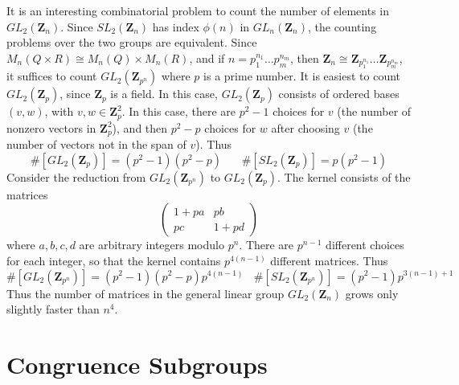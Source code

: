 It is an interesting combinatorial problem to count the number of elements in $GL_2(\mathbf{Z}_n)$. Since $SL_2(\mathbf{Z}_n)$ has index $\phi(n)$ in $GL_n(\mathbf{Z}_n)$, the counting problems over the two groups are equivalent. Since $M_n(Q \times R) \cong M_n(Q) \times M_n(R)$, and if $n = p_1^{n_1} \dots p_m^{n_m}$, then $\mathbf{Z}_n \cong \mathbf{Z}_{p_1^{n_1}} \dots \mathbf{Z}_{p_m^{n_m}}$, it suffices to count $GL_2(\mathbf{Z}_{p^n})$ where $p$ is a prime number. It is easiest to count $GL_2(\mathbf{Z}_p)$, since $\mathbf{Z}_p$ is a field. In this case, $GL_2(\mathbf{Z}_p)$ consists of ordered bases $(v,w)$, with $v,w \in \mathbf{Z}_p^2$. In this case, there are $p^2 - 1$ choices for $v$ (the number of nonzero vectors in $\mathbf{Z}_p^2$), and then $p^2 - p$ choices for $w$ after choosing $v$ (the number of vectors not in the span of $v$). Thus
%
\[ \#[GL_2(\mathbf{Z}_p)] = (p^2 - 1)(p^2 - p)\ \ \ \ \ \ \ \ \#[SL_2(\mathbf{Z}_p)] = p (p^2 - 1) \]
%
Consider the reduction from $GL_2(\mathbf{Z}_{p^n})$ to $GL_2(\mathbf{Z}_p)$. The kernel consists of the matrices
%
\[ \begin{pmatrix} 1 + pa & pb \\ pc & 1 + pd \end{pmatrix} \]
%
where $a,b,c,d$ are arbitrary integers modulo $p^n$. There are $p^{n-1}$ different choices for each integer, so that the kernel contains $p^{4(n-1)}$ different matrices. Thus
%
\[ \#[GL_2(\mathbf{Z}_{p^n})] = (p^2 - 1)(p^2 - p) p^{4(n-1)}\ \ \ \ \#[SL_2(\mathbf{Z}_{p^n})] = (p^2 - 1)p^{3(n-1) + 1} \]
%
Thus the number of matrices in the general linear group $GL_2(\mathbf{Z}_n)$ grows only slightly faster than $n^4$.

\section{Congruence Subgroups}

